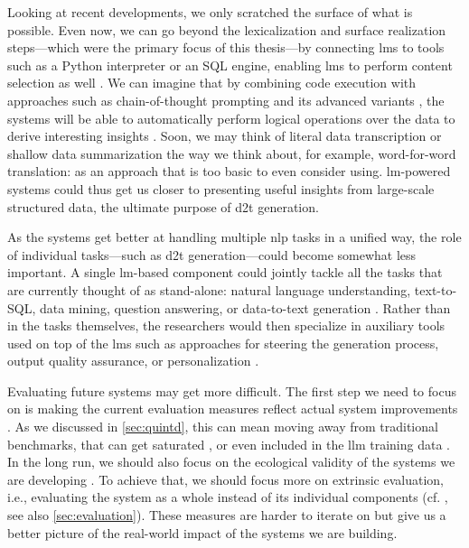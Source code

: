 Looking at recent developments, we only scratched the surface of what is possible. Even now, we can go beyond the lexicalization and surface realization steps---which were the primary focus of this thesis---by connecting \acp{lm} to tools such as a Python interpreter or an SQL engine, enabling \acp{lm} to perform content selection as well \cite{cao-etal-2023-api,jiang-etal-2023-structgpt,gemmell2023generate}. We can imagine that by combining code execution with approaches such as chain-of-thought prompting and its advanced variants \cite{weiChainThoughtPrompting2022,chu2023survey}, the systems will be able to automatically perform logical operations over the data to derive interesting insights \cite{zhao-etal-2023-qtsumm,chenLogicalNaturalLanguage2020,chenLogic2TextHighFidelityNatural2020}. Soon, we may think of literal data transcription or shallow data summarization the way we think about, for example, word-for-word translation: as an approach that is too basic to even consider using. \ac{lm}-powered systems could thus get us closer to presenting useful insights from large-scale structured data, the ultimate purpose of \ac{d2t} generation.

As the systems get better at handling multiple \ac{nlp} tasks in a unified way, the role of individual tasks---such as \ac{d2t} generation---could become somewhat less important. A single \ac{lm}-based component could jointly tackle all the tasks that are currently thought of as stand-alone: natural language understanding, text-to-SQL, data mining, question answering, or data-to-text generation \cite{schopf-etal-2023-exploring,chen2024multi}. Rather than in the tasks themselves, the researchers would then specialize in auxiliary tools used on top of the \acp{lm} such as approaches for steering the generation process, output quality assurance, or personalization \cite{zhang2023survey,chen2023personalization}.


Evaluating future systems may get more difficult. The first step we need to focus on is making the current evaluation measures reflect actual system improvements \cite{gehrmannRepairingCrackedFoundation2022,van_miltenburg_barriers_2023}.  As we discussed in \autoref{sec:quintd}, this can mean moving away from traditional benchmarks, that can get saturated \cite{kiela-etal-2021-dynabench,raji2021ai}, or even included in the \ac{llm} training data \cite{balloccu2024leak}. In the long run, we should also focus on the ecological validity of the systems we are developing \cite{reiter2020ecological}. To achieve that, we should focus more on extrinsic evaluation, i.e., evaluating the system as a whole instead of its individual components (cf. \citealp{reiter2003lessons,di-eugenio-etal-2002-diag}, see also \autoref{sec:evaluation}). These measures are harder to iterate on but give us a better picture of the real-world impact of the systems we are building.

